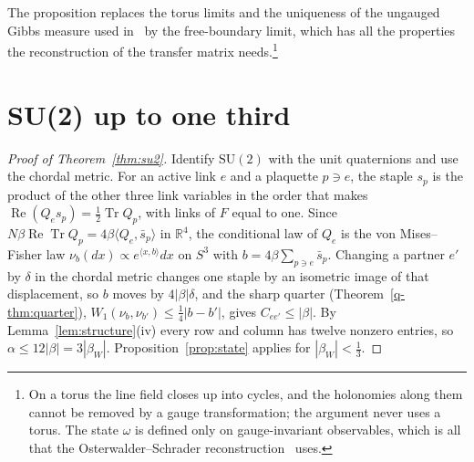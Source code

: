 \documentclass[11pt]{amsart}
\theoremstyle{definition}
\theoremstyle{remark}
\numberwithin{equation}{section}
\newcommand{\R}{\mathbb{R}}
\newcommand{\SU}{\mathrm{SU}}
\newcommand{\Tr}{\operatorname{Tr}}
\newcommand{\ReTr}{\operatorname{Re}\operatorname{Tr}}
\newcommand{\ip}[2]{\langle #1,#2\rangle}
\begin{document}
The proposition replaces the torus limits and the uniqueness of the
ungauged Gibbs measure used in~\cite[Thm.~F]{BB26a} by the free-boundary
limit, which has all the properties the reconstruction of the transfer
matrix needs.\footnote{On a torus the line field closes up into cycles, and
the holonomies along them cannot be removed by a gauge transformation; the
argument never uses a torus. The state $\omega$ is defined only on
gauge-invariant observables, which is all that the Osterwalder--Schrader
reconstruction~\cite{OS73,OS75,OSei78} uses.}

\section{SU(2) up to one third}\label{sec:su2}

\begin{proof}[Proof of Theorem~\ref{thm:su2}]
Identify $\SU(2)$ with the unit quaternions and use the chordal metric. For an
active link $e$ and a plaquette $p\ni e$, the staple $s_p$ is the product of the
other three link variables in the order that makes $\operatorname{Re}(Q_es_p)
=\frac12\Tr Q_p$, with links of $F$ equal to one. Since $N\beta\ReTr Q_p=
4\beta\ip{Q_e}{\bar s_p}$ in $\R^4$, the conditional law of $Q_e$ is the von
Mises--Fisher law $\nu_b(dx)\propto e^{\ip xb}dx$ on $S^3$ with $b=4\beta
\sum_{p\ni e}\bar s_p$. Changing a partner $e'$ by $\delta$ in the chordal
metric changes one staple by an isometric image of that displacement, so $b$
moves by $4|\beta|\delta$, and the sharp quarter (Theorem~\ref{q-thm:quarter}),
$W_1(\nu_b,\nu_{b'})\le\frac14|b-b'|$, gives $C_{ee'}\le|\beta|$. By
Lemma~\ref{lem:structure}(iv) every row and column has twelve nonzero
entries, so $\alpha\le12|\beta|=3|\beta_W|$. Proposition~\ref{prop:state}
applies for $|\beta_W|<\frac13$.
\end{proof}
\end{document}
